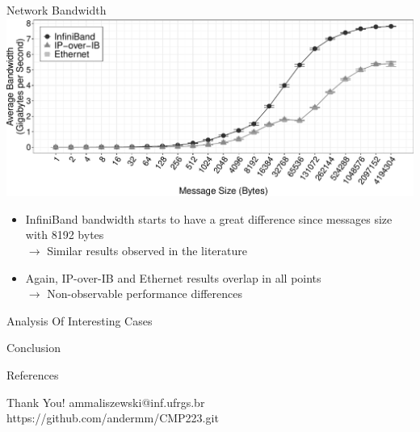 \documentclass[presentation]{beamer}
\begin{document}
\begin{frame}{Network Bandwidth}
\includegraphics[width=\textwidth]{SLIDES/img/Bandwidth.pdf}
\vfill\pause
\begin{itemize}
    \item InfiniBand bandwidth starts to have a great difference since messages size with 8192 bytes\\
        $\to$ Similar results observed in the literature
    \item\pause Again, IP-over-IB and Ethernet results overlap in all points\\
        $\to$ Non-observable performance differences
\end{itemize}
\end{frame}

\begin{frame}{Analysis Of Interesting Cases}

\end{frame}

\begin{frame}{Conclusion}

\end{frame}

\begin{frame}{References}

\end{frame}

\begin{frame}{}
\begin{center}
\Huge{Thank You!}
\vfill
\Large{ammaliszewski@inf.ufrgs.br}
\vfill
\small{https://github.com/andermm/CMP223.git}
\end{center}
\end{frame}

\maketitle
\end{document}
